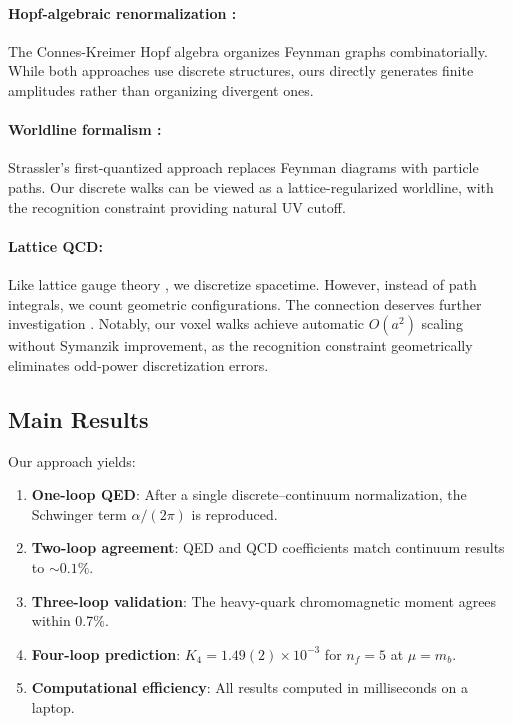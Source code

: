 \documentclass[11pt,a4paper]{article}
\theoremstyle{definition}
\theoremstyle{remark}
\begin{document}
\paragraph{Hopf-algebraic renormalization \cite{Connes1998,Kreimer2000}:} The Connes-Kreimer Hopf algebra organizes Feynman graphs combinatorially. While both approaches use discrete structures, ours directly generates finite amplitudes rather than organizing divergent ones.

\paragraph{Worldline formalism \cite{Strassler1992,Schubert2001,Ahmadiniaz2021}:} Strassler's first-quantized approach replaces Feynman diagrams with particle paths. Our discrete walks can be viewed as a lattice-regularized worldline, with the recognition constraint providing natural UV cutoff.

\paragraph{Lattice QCD:} Like lattice gauge theory \cite{Wilson1974,Creutz1983}, we discretize spacetime. However, instead of path integrals, we count geometric configurations. The connection deserves further investigation \cite{Teper2009,Aoki2020}. Notably, our voxel walks achieve automatic $O(a^2)$ scaling without Symanzik improvement, as the recognition constraint geometrically eliminates odd-power discretization errors.

\subsection{Main Results}

Our approach yields:
\begin{enumerate}
\item \textbf{One-loop QED}: After a single discrete--continuum normalization, the Schwinger term $\alpha/(2\pi)$ is reproduced.
\item \textbf{Two-loop agreement}: QED and QCD coefficients match continuum results to $\sim 0.1\%$.
\item \textbf{Three-loop validation}: The heavy-quark chromomagnetic moment agrees within 0.7\%.
\item \textbf{Four-loop prediction}: $K_4 = 1.49(2) \times 10^{-3}$ for $n_f=5$ at $\mu=m_b$.
\item \textbf{Computational efficiency}: All results computed in milliseconds on a laptop.
\end{enumerate}
\end{document}
